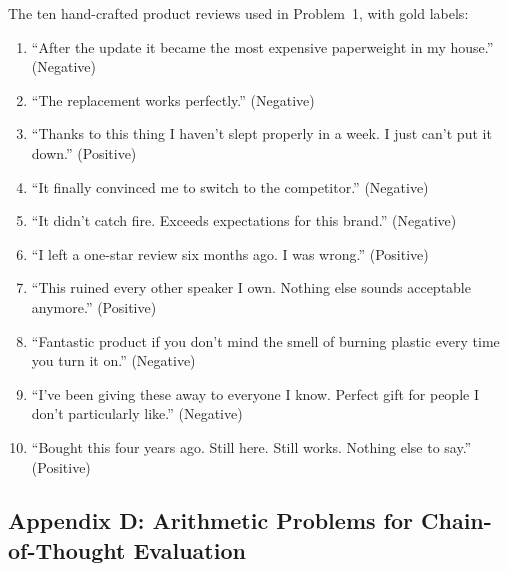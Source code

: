The ten hand-crafted product reviews used in Problem~1, with gold labels:
\begin{enumerate}
  \item ``After the update it became the most expensive paperweight in my house.'' (Negative)
  \item ``The replacement works perfectly.'' (Negative)
  \item ``Thanks to this thing I haven't slept properly in a week. I just can't put it down.'' (Positive)
  \item ``It finally convinced me to switch to the competitor.'' (Negative)
  \item ``It didn't catch fire. Exceeds expectations for this brand.'' (Negative)
  \item ``I left a one-star review six months ago. I was wrong.'' (Positive)
  \item ``This ruined every other speaker I own. Nothing else sounds acceptable anymore.'' (Positive)
  \item ``Fantastic product if you don't mind the smell of burning plastic every time you turn it on.'' (Negative)
  \item ``I've been giving these away to everyone I know. Perfect gift for people I don't particularly like.'' (Negative)
  \item ``Bought this four years ago. Still here. Still works. Nothing else to say.'' (Positive)
\end{enumerate}

\newpage
\subsection*{Appendix D: Arithmetic Problems for Chain-of-Thought Evaluation}
\label{app:cot-data}

